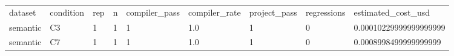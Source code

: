 \begin{tabular}{lllllllll}
dataset & condition & rep & n & compiler\_pass & compiler\_rate & project\_pass & regressions & estimated\_cost\_usd \\
semantic & C3 & 1 & 1 & 1 & 1.0 & 1 & 0 & 0.00010229999999999999 \\
semantic & C7 & 1 & 1 & 1 & 1.0 & 1 & 0 & 0.0008998499999999999 \\
\end{tabular}